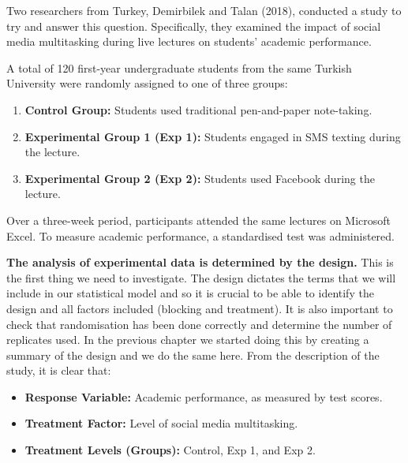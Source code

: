 \documentclass[
  letterpaper,
]{book}
\providecommand{\tightlist}{%
  \setlength{\itemsep}{0pt}\setlength{\parskip}{0pt}}\usepackage{longtable,booktabs,array}
\begin{document}
\begin{tcolorbox}[enhanced jigsaw, coltitle=black, title={Example 5.1}, breakable, bottomtitle=1mm, bottomrule=.15mm, colback=white, toprule=.15mm, rightrule=.15mm, opacitybacktitle=0.6, arc=.35mm, toptitle=1mm, colframe=quarto-callout-warning-color-frame, colbacktitle=quarto-callout-warning-color!10!white, titlerule=0mm, leftrule=.75mm, opacityback=0, left=2mm]

Two researchers from Turkey, Demirbilek and Talan (2018), conducted a
study to try and answer this question. Specifically, they examined the
impact of social media multitasking during live lectures on students'
academic performance.

A total of 120 first-year undergraduate students from the same Turkish
University were randomly assigned to one of three groups:

\begin{enumerate}
\def\labelenumi{\arabic{enumi}.}
\tightlist
\item
  \textbf{Control Group:} Students used traditional pen-and-paper
  note-taking.
\item
  \textbf{Experimental Group 1 (Exp 1):} Students engaged in SMS texting
  during the lecture.
\item
  \textbf{Experimental Group 2 (Exp 2):} Students used Facebook during
  the lecture.
\end{enumerate}

Over a three-week period, participants attended the same lectures on
Microsoft Excel. To measure academic performance, a standardised test
was administered.

\end{tcolorbox}

\textbf{The analysis of experimental data is determined by the design.}
This is the first thing we need to investigate. The design dictates the
terms that we will include in our statistical model and so it is crucial
to be able to identify the design and all factors included (blocking and
treatment). It is also important to check that randomisation has been
done correctly and determine the number of replicates used. In the
previous chapter we started doing this by creating a summary of the
design and we do the same here. From the description of the study, it is
clear that:

\begin{itemize}
\tightlist
\item
  \textbf{Response Variable:} Academic performance, as measured by test
  scores.
\item
  \textbf{Treatment Factor:} Level of social media multitasking.
\item
  \textbf{Treatment Levels (Groups):} Control, Exp 1, and Exp 2.
\end{itemize}
\end{document}
